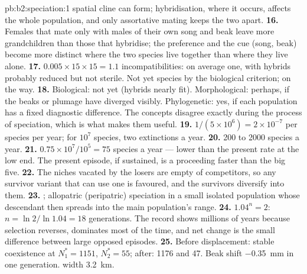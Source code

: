 \begin{solution}{pb:b2:speciation:1}
spatial cline can form; hybridisation, where it occurs, affects
the whole population, and only assortative mating keeps the two
apart.
\textbf{16.} Females that mate only with males of their own song and
beak leave more grandchildren than those that hybridise; the
preference and the cue (song, beak) become more distinct where the
two species live together than where they live alone.
\textbf{17.} $0.005\times 15\times 15 = 1.1$ incompatibilities: on
average one, with hybrids probably reduced but not sterile. Not yet
species by the biological criterion; on the way.
\textbf{18.} Biological: not yet (hybrids nearly fit).
Morphological: perhaps, if the beaks or plumage have diverged
visibly. Phylogenetic: yes, if each population has a fixed
diagnostic difference. The concepts disagree exactly during the
process of speciation, which is what makes them useful.
\textbf{19.} $1/(5\times 10^{6}) = 2\times 10^{-7}$ per species per
year; for $10^{7}$ species, two extinctions a year.
\textbf{20.} 200 to 2000 species a year.
\textbf{21.} $0.75\times 10^{7}/10^{5} = 75$ species a year --- lower
than the present rate at the low end. The present episode, if
sustained, is a  proceeding faster than the big
five.
\textbf{22.} The niches vacated by the losers are empty of
competitors, so any survivor variant that can use one is favoured,
and the survivors diversify into them.
\textbf{23.} ; allopatric (peripatric)
speciation in a small isolated population whose descendant then
spreads into the main population's range.
\textbf{24.} $1.04^{n} = 2$: $n = \ln 2/\ln 1.04 = 18$ generations.
The record shows millions of years because selection reverses,
 dominates most of the time, and net change is
the small difference between large opposed episodes.
\textbf{25.} Before displacement: stable coexistence at $N_1^{*} =
1151$, $N_2^{*} = 55$; after: 1176 and 47. Beak shift
\qty{-0.35}{mm} in one generation.  width \qty{3.2}{km}.
\end{solution}
